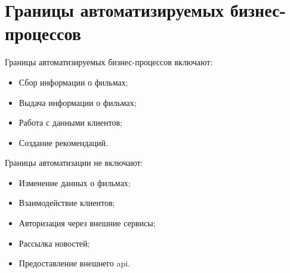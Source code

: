 \section{Границы автоматизируемых бизнес-процессов}

Границы автоматизируемых бизнес-процессов включают:

\begin{itemize}
    \item Сбор информации о фильмах;
    \item Выдача информации о фильмах;
    \item Работа с данными клиентов;
    \item Создание рекомендаций.
\end{itemize}

Границы автоматизации не включают:

\begin{itemize}
    \item Изменение данных о фильмах;
    \item Взаимодействие клиентов;
    \item Авторизация через внешние сервисы;
    \item Рассылка новостей;
    \item Предоставление внешнего api.
\end{itemize}